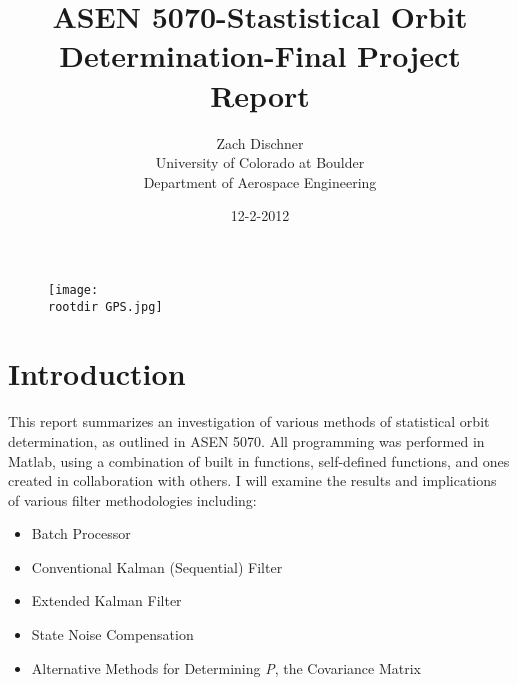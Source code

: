 \documentclass[12pt,a4paper,oneside]{article}
\newcommand{\rootdir}{./Figures/}
\begin{document}
\title{ASEN 5070-Stastistical Orbit Determination-Final Project Report}
\author{Zach Dischner \\ University of Colorado at Boulder \\ Department of Aerospace Engineering}
\date{12-2-2012}
\maketitle

\begin{center}
	\begin{figure}[H]
		\texttt{[image: \\rootdir GPS.jpg]}    \cite{GPS}
	\end{figure}
\end{center}


\newpage
\section{Introduction}
This report summarizes an investigation of various methods of statistical orbit determination, as outlined in ASEN 5070. All programming was performed in Matlab, using a combination of built in functions,  self-defined functions, and ones created in collaboration with others. I will examine the results and implications of various filter methodologies including:

\begin{itemize}
	\renewcommand{\labelitemi}{$\bullet$}
	\item Batch Processor
	\item Conventional Kalman (Sequential) Filter
	\item Extended Kalman Filter
	\item State Noise Compensation
	\item Alternative Methods for Determining \emph{P}, the Covariance Matrix
\end{itemize}


\newpage
\tableofcontents{}
\listoffigures{}
\end{document}
